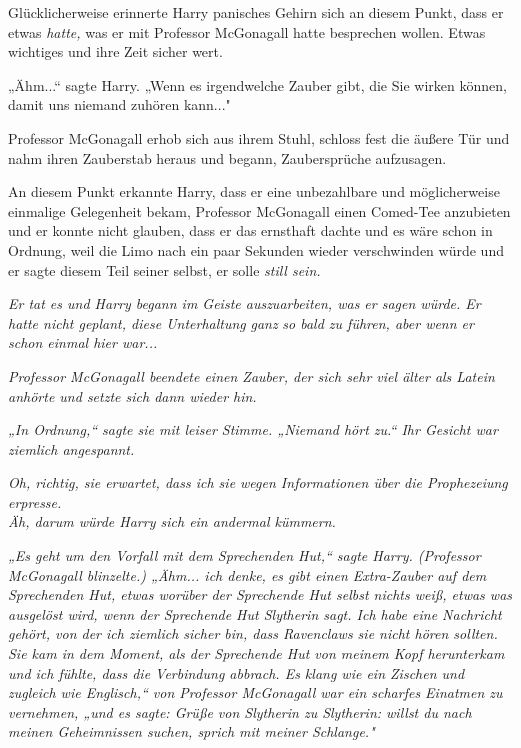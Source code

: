 {Glücklicherweise erinnerte Harry panisches Gehirn sich an diesem Punkt, dass er etwas \emph{hatte,} was er mit Professor McGonagall hatte besprechen wollen. Etwas wichtiges und ihre Zeit sicher wert.

„Ähm...“ sagte Harry. „Wenn es irgendwelche Zauber gibt, die Sie wirken können, damit uns niemand zuhören kann..."

Professor McGonagall erhob sich aus ihrem Stuhl, schloss fest die äußere Tür und nahm ihren Zauberstab heraus und begann, Zaubersprüche aufzusagen.

An diesem Punkt erkannte Harry, dass er eine unbezahlbare und möglicherweise einmalige Gelegenheit bekam, Professor McGonagall einen Comed-Tee anzubieten und er konnte nicht glauben, dass er das ernsthaft dachte und es wäre schon in Ordnung, weil die Limo nach ein paar Sekunden wieder verschwinden würde und er sagte diesem Teil seiner selbst, er solle \emph{still sein.}

\emph{Er tat es und Harry begann im Geiste auszuarbeiten, was er sagen würde. Er hatte nicht geplant, diese Unterhaltung} \emph{\emph{ganz}} \emph{so bald zu führen, aber wenn er schon einmal hier war...}

\emph{Professor McGonagall beendete einen Zauber, der sich sehr viel älter als Latein anhörte und setzte sich dann wieder hin.}

\emph{„In Ordnung,“ sagte sie mit leiser Stimme. „Niemand hört zu.“ Ihr Gesicht war ziemlich angespannt.}

\emph{\emph{Oh, richtig, sie erwartet, dass ich sie wegen Informationen über die Prophezeiung erpresse.}}\\ \emph{Äh, darum würde Harry sich ein andermal kümmern.}

\emph{„Es geht um den Vorfall mit dem Sprechenden Hut,“ sagte Harry. (Professor McGonagall blinzelte.) „Ähm... ich denke, es gibt einen Extra-Zauber auf dem Sprechenden Hut, etwas worüber der Sprechende Hut selbst nichts weiß, etwas was ausgelöst wird, wenn der Sprechende Hut Slytherin sagt. Ich habe eine Nachricht gehört, von der ich ziemlich sicher bin, dass Ravenclaws sie nicht hören sollten. Sie kam in dem Moment, als der Sprechende Hut von meinem Kopf herunterkam und ich fühlte, dass die Verbindung abbrach. Es klang wie ein Zischen und zugleich wie Englisch,“ von Professor McGonagall war ein scharfes Einatmen zu vernehmen, „und es sagte: Grüße von Slytherin zu Slytherin: willst du nach meinen Geheimnissen suchen, sprich mit meiner Schlange."}

}

